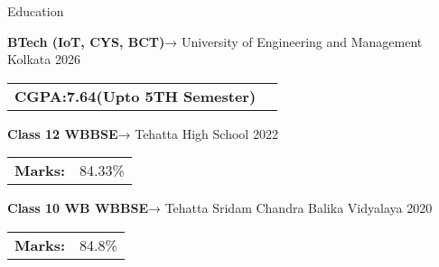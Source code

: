 \documentclass{resume}
\begin{document}

\vspace{-0.4em}
\begin{rSection}{Education}

    {\bf BTech (IoT, CYS, BCT)}→ University of Engineering and Management Kolkata \hfill {2026}\\
    \begin{tabular}{>{\bfseries}l l}
        CGPA:7.64(Upto 5TH Semester)
    \end{tabular}

    \vspace{-0.4em}
    {\bf Class 12 WBBSE}→ Tehatta High School \hfill {2022}\\
    \begin{tabular}{>{\bfseries}l l}
        Marks:    & 84.33\%
    \end{tabular}

    {\bf Class 10 WB WBBSE}→ Tehatta Sridam Chandra Balika Vidyalaya \hfill {2020}\\
    \begin{tabular}{>{\bfseries}l l}
        Marks:    & 84.8\%
    \end{tabular}
\end{rSection}
\vspace{1em}

\end{document}
